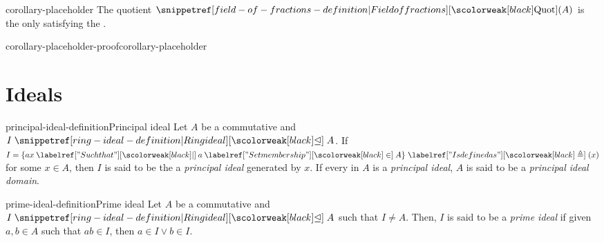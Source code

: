 \documentclass[preview]{standalone}
\begin{document}
\begin{snippetcorollary}{corollary-placeholder}{}
    The quotient \(\quotientfield(A)\) is the only \field satisfying
    the .
\end{snippetcorollary}

\begin{snippetproof}{corollary-placeholder-proof}{corollary-placeholder}{}
    \begin{center}
    \end{center}
    \todo %
\end{snippetproof}

\section{Ideals}

\begin{snippetdefinition}{principal-ideal-definition}{Principal ideal}
    Let \(A\) be a commutative \ring and \(I \idealin A\).
    If \(I = \{ax \suchthat a \in A\} \triangleq (x)\)
    for some \(x\in A\), then \(I\) is said to be the a \emph{principal ideal}
    generated by \(x\). If every \ideal in \(A\)
    is a \emph{principal ideal}, \(A\) is said to be a \emph{principal ideal domain}.
\end{snippetdefinition}

\begin{snippetdefinition}{prime-ideal-definition}{Prime ideal}
    Let \(A\) be a commutative \ring and \(I \idealin A\) such that \(I\neq A\).
    Then, \(I\) is said to be a \emph{prime ideal}
    if given \(a,b \in A\) such that \(ab\in I\), then
    \(a \in I \lor b \in I\).
\end{snippetdefinition}
\end{document}
